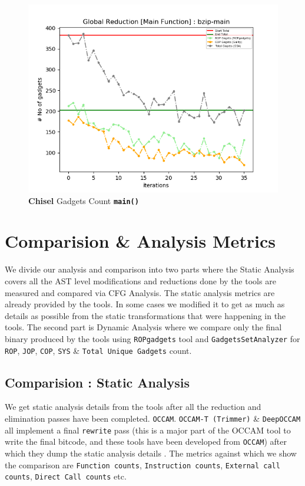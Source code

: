 \documentclass{relatorio}
\begin{document}
\begin{figure}[H]
	\includegraphics[width=1\linewidth]{imgs/plots/chisel_gadgets_bzip-main_plot.png}
	\caption{\textbf{Chisel} Gadgets Count \textbf{\texttt{main()}}}%
	\label{fig:plant}
\end{figure}

\section{Comparision \& Analysis Metrics}%
\label{Tools}

We divide our analysis and comparison into two parts where the Static Analysis covers all the AST level modifications and reductions done by the tools are measured and compared via CFG Analysis. The static analysis metrics are already provided by the tools. In some cases we modified it to get as much as details as possible from the static transformations that were happening in the tools. The second part is Dynamic Analysis where we compare only the final binary produced by the tools using \texttt{ROPgadgets} tool and \texttt{GadgetsSetAnalyzer} for \texttt{ROP}, \texttt{JOP}, \texttt{COP}, \texttt{SYS} \& \texttt{Total Unique Gadgets} count. 

\subsection{Comparision : Static Analysis}%
\label{Tools}

We get static analysis details from the tools after all the reduction and elimination passes have been completed. \texttt{OCCAM}. \texttt{OCCAM-T (Trimmer)} \& \texttt{DeepOCCAM} all implement a final \texttt{rewrite} pass (this is a major part of the OCCAM tool to write the final bitcode, and these tools have been developed from \texttt{OCCAM}) after which they dump the static analysis details . The metrics against which we show the comparison are \texttt{Function counts}, \texttt{Instruction counts}, \texttt{External call counts}, \texttt{Direct Call counts} etc. 
\end{document}

